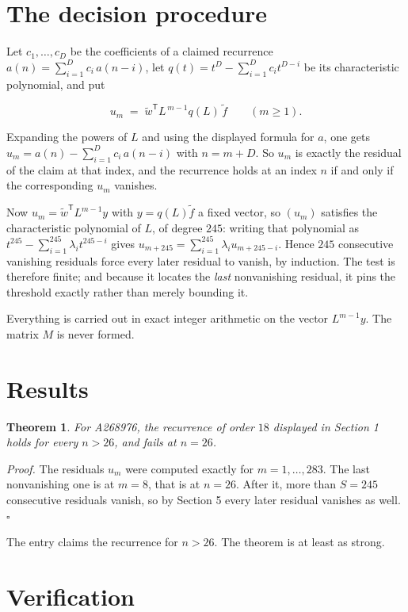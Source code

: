 \documentclass[11pt]{article}
\newtheorem{theorem}{Theorem}
\theoremstyle{definition}
\begin{document}
\section{The decision procedure}

Let $c_1,\dots,c_D$ be the coefficients of a claimed recurrence $a(n) = \sum_{i=1}^{D} c_i\,a(n-i)$, let $q(t) = t^{D} - \sum_{i=1}^{D} c_i t^{D-i}$ be its characteristic polynomial, and put

\[u_m \;=\; \tilde w^{\mathsf T} L^{\,m-1} q(L)\,\tilde f \qquad (m \ge 1).\]

Expanding the powers of $L$ and using the displayed formula for $a$, one gets $u_m = a(n) - \sum_{i=1}^{D} c_i\,a(n-i)$ with $n = m + D$. So $u_m$ is exactly the residual of the claim at that index, and the recurrence holds at an index $n$ if and only if the corresponding $u_m$ vanishes.

Now $u_m = \tilde w^{\mathsf T} L^{m-1} y$ with $y = q(L)\tilde f$ a fixed vector, so $(u_m)$ satisfies the characteristic polynomial of $L$, of degree $245$: writing that polynomial as $t^{245} - \sum_{i=1}^{245} \lambda_i t^{245-i}$ gives $u_{m+245} = \sum_{i=1}^{245} \lambda_i u_{m+245-i}$. Hence $245$ consecutive vanishing residuals force every later residual to vanish, by induction. The test is therefore finite; and because it locates the {\itshape last} nonvanishing residual, it pins the threshold exactly rather than merely bounding it.

Everything is carried out in exact integer arithmetic on the vector $L^{m-1}y$. The matrix $M$ is never formed.

\section{Results}

\begin{theorem} For A268976, the recurrence of order $18$ displayed in Section 1 holds for every $n > 26$, and fails at $n = 26$.\end{theorem}

{\itshape Proof.} The residuals $u_m$ were computed exactly for $m = 1,\dots,283$. The last nonvanishing one is at $m = 8$, that is at $n = 26$. After it, more than $S = 245$ consecutive residuals vanish, so by Section 5 every later residual vanishes as well. $\square$

The entry claims the recurrence for $n > 26$. The theorem is at least as strong.

\section{Verification}
\end{document}
